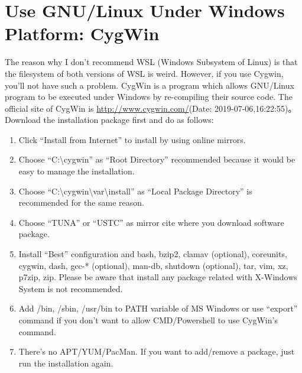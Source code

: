 \section{Use GNU/Linux Under Windows Platform: CygWin}
The reason why I don't recommend WSL (Windows Subsystem of Linux) is that the filesystem of both versions of WSL is weird. However, if you use Cygwin, you'll not have such a problem. CygWin is a program which allows GNU/Linux program to be executed under Windows by re-compiling their source code. The official site of CygWin is \url{http://www.cygwin.com/}(Date: 2019-07-06,16:22:55)。Download the installation package first and do as follows:
\begin{enumerate}
	\item Click ``Install from Internet'' to install by using online mirrors.
	\item Choose ``C:\textbackslash cygwin'' as ``Root  Directory'' recommended because it would be easy to manage the installation.
	\item Choose  ``C:\textbackslash cygwin\textbackslash var\textbackslash install'' as ``Local Package Directory'' is recommended for the same reason.
	\item Choose ``TUNA'' or ``USTC'' as mirror cite where you download software package.
	\item Install ``Best'' configuration and bash, bzip2, clamav (optional), coreunits, cygwin, dash, gcc-* (optional), man-db, shutdown (optional), tar, vim, xz, p7zip, zip. Please be aware that install any package related with X-Windows System is not recommended.
	\item Add /bin, /sbin, /usr/bin to PATH variable of MS Windows or use ``export'' command if you don't want to allow CMD/Powershell to use CygWin's command.
	\item There's no APT/YUM/PacMan. If you want to add/remove a package, just run the installation again.
\end{enumerate}
